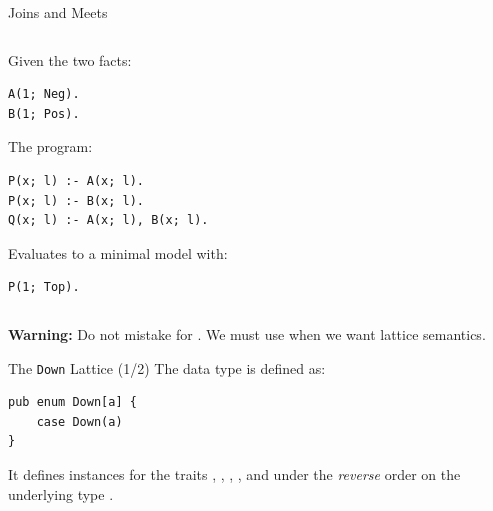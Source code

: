 \begin{frame}[fragile]{Joins and Meets}
\begin{columns}
\begin{column}{.5\textwidth}
Given the two facts:

\begin{lstlisting}[language=flix, xleftmargin=0.8cm]
A(1; Neg).
B(1; Pos).
\end{lstlisting}

The program:

\begin{lstlisting}[language=flix, xleftmargin=0.8cm]
P(x; l) :- A(x; l).
P(x; l) :- B(x; l).
Q(x; l) :- A(x; l), B(x; l).
\end{lstlisting}

\pause

Evaluates to a minimal model with:

\begin{lstlisting}[language=flix, xleftmargin=0.8cm]
P(1; Top).
\end{lstlisting}

\end{column}
\begin{column}{.5\textwidth}
\centering
{}
\end{column}
\end{columns}

\medskip

\pause

{
\small
\textbf{Warning:} Do not mistake \Code{,} for \Code{;}. We must use \Code{;}
when we want lattice semantics. 
}

\end{frame}

\begin{frame}[fragile]{The \texttt{Down} Lattice (1/2)}
The  data type is defined as: 

\begin{lstlisting}[language=flix, xleftmargin=0.8cm]
pub enum Down[a] {
    case Down(a)
}
\end{lstlisting}

It defines instances for the traits , ,
, , and  under the
\emph{reverse} order on the underlying type .
\end{frame}

